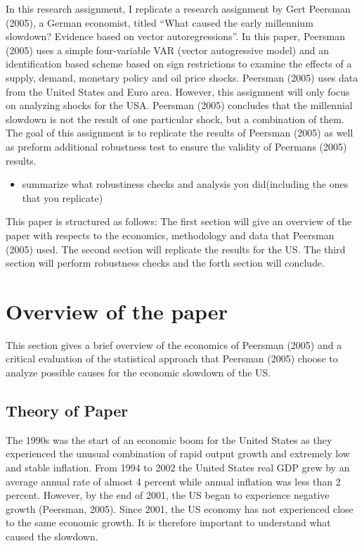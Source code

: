 \documentclass[11pt,preprint, authoryear]{elsarticle}
\numberwithin{equation}{section}
\numberwithin{figure}{section}
\numberwithin{table}{section}
\def\tightlist{} %
\begin{document}
In this research assignment, I replicate a research assignment by Gert
Peersman (2005), a German economist, titled ``What caused the early
millennium slowdown? Evidence based on vector autoregressions''. In this
paper, Peersman (2005) uses a simple four-variable VAR (vector
autogressive model) and an identification based scheme based on sign
restrictions to examine the effects of a supply, demand, monetary policy
and oil price shocks. Peersman (2005) uses data from the United States
and Euro area. However, this assignment will only focus on analyzing
shocks for the USA. Peersman (2005) concludes that the millennial
slowdown is not the result of one particular shock, but a combination of
them. The goal of this assignment is to replicate the results of
Peersman (2005) as well as preform additional robustness test to ensure
the validity of Peermans (2005) results.

\begin{itemize}
\tightlist
\item
  summarize what robustiness checks and analysis you did(including the
  ones that you replicate)
\end{itemize}

This paper is structured as follows: The first section will give an
overview of the paper with respects to the economics, methodology and
data that Peersman (2005) used. The second section will replicate the
results for the US. The third section will perform robustness checks and
the forth section will conclude.

\hypertarget{overview-of-the-paper}{%
\section{Overview of the paper}\label{overview-of-the-paper}}

This section gives a brief overview of the economics of Peersman (2005)
and a critical evaluation of the statistical approach that Peersman
(2005) choose to analyze possible causes for the economic slowdown of
the US.

\hypertarget{theory-of-paper}{%
\subsection{Theory of Paper}\label{theory-of-paper}}

The 1990s was the start of an economic boom for the United States as
they experienced the unusual combination of rapid output growth and
extremely low and stable inflation. From 1994 to 2002 the United States
real GDP grew by an average annual rate of almost 4 percent while annual
inflation was less than 2 percent. However, by the end of 2001, the US
began to experience negative growth (Peersman, 2005). Since 2001, the US
economy has not experienced close to the same economic growth. It is
therefore important to understand what caused the slowdown.
\end{document}
